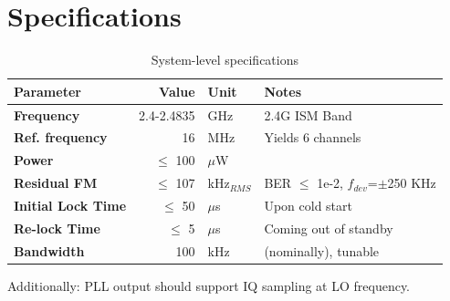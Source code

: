 \documentclass[10pt,a4paper]{article}
\begin{document}
	\section{Specifications}
		\scriptsize
		\begin{table}[h!]
			\centering
			\def\arraystretch{1.5}		
			\setlength\arrayrulewidth{0.75pt}
			\setlength{\tabcolsep}{1em} %
			\begin{tabular}{|l|r|l|l|}
				\hline 
				\rule[-1ex]{0pt}{2.5ex} \cellcolor{gray!40}\textbf{Parameter} & \cellcolor{gray!40}\textbf{Value} & \cellcolor{gray!40}\textbf{Unit }& \cellcolor{gray!40}\textbf{Notes}\\ 
				\hline 
				\rule[-1ex]{0pt}{2.5ex} \textbf{Frequency}  & 2.4-2.4835 & GHz & 2.4G ISM Band\\ 
				\hline 
				\rule[-1ex]{0pt}{2.5ex} \textbf{Ref. frequency} & 16 & MHz & Yields 6 channels \\ 
				\hline 
				\rule[-1ex]{0pt}{2.5ex} \textbf{Power} & $\leq$ 100  &$\mu$W & \\ 
				\hline 
				\rule[-1ex]{0pt}{2.5ex} \textbf{Residual FM} & $\leq$ 107  &kHz$_{RMS}$ & BER $\leq$ 1e-2, $f_{dev}$=$\pm$250 KHz\\ 
				\hline 
				\rule[-1ex]{0pt}{2.5ex} \textbf{Initial Lock Time} & $\leq$ 50 & $\mu$s & Upon cold start \\ 
				\hline 
				\rule[-1ex]{0pt}{2.5ex} \textbf{Re-lock Time} & $\leq$ 5 & $\mu$s & Coming out of standby \\ 
				\hline 
				\rule[-1ex]{0pt}{2.5ex} \textbf{Bandwidth} & 100 & kHz & (nominally), tunable \\ 
				\hline 
			\end{tabular} 
			\caption{System-level specifications}
		\end{table}   
		Additionally: PLL output should support IQ sampling at LO frequency.
\end{document}
